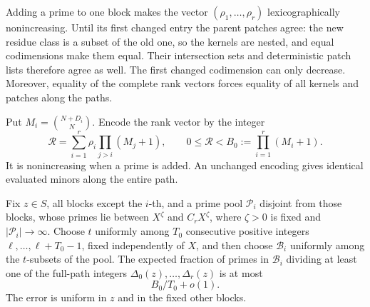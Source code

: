 Adding a prime to one block makes the vector
$(\rho_1,\ldots,\rho_r)$ lexicographically nonincreasing.  Until its
first changed entry the parent patches agree: the new residue class
is a subset of the old one, so the kernels are nested, and equal
codimensions make them equal.  Their intersection sets and deterministic
patch lists therefore agree as well.  The first changed codimension
can only decrease.  Moreover, equality of the complete rank vectors
forces equality of all kernels and patches along the paths.

Put $M_i=\binom{N+D_i}{N}$.  Encode the rank vector by the integer
\begin{equation}\label{eq:affine-rank-record}
 \mathcal R=\sum_{i=1}^r\rho_i\prod_{j>i}(M_j+1),
 \qquad 0\le\mathcal R<B_0:=\prod_{i=1}^r(M_i+1).
\end{equation}
It is nonincreasing when a prime is added.  An unchanged encoding
gives identical evaluated minors along the entire path.

\begin{lemma}\label{lem:affine-deletion}
Fix $z\in S$, all blocks except the $i$-th, and a prime pool
$\mathcal P_i$ disjoint from those blocks, whose primes lie between
$X^\zeta$ and $C_rX^\zeta$,
where $\zeta>0$ is fixed and $|\mathcal P_i|\longrightarrow\infty$.
Choose $t$ uniformly among $T_0$ consecutive positive integers
$\ell,\ldots,\ell+T_0-1$, fixed independently of $X$, and then choose
$\mathcal B_i$ uniformly among the $t$-subsets of the pool.  The
expected fraction of primes in $\mathcal B_i$ dividing at least one
of the full-path integers $\Delta_0(z),\ldots,\Delta_r(z)$ is at most
\[
 B_0/T_0+o(1).
\]
The error is uniform in $z$ and in the fixed other blocks.
\end{lemma}


